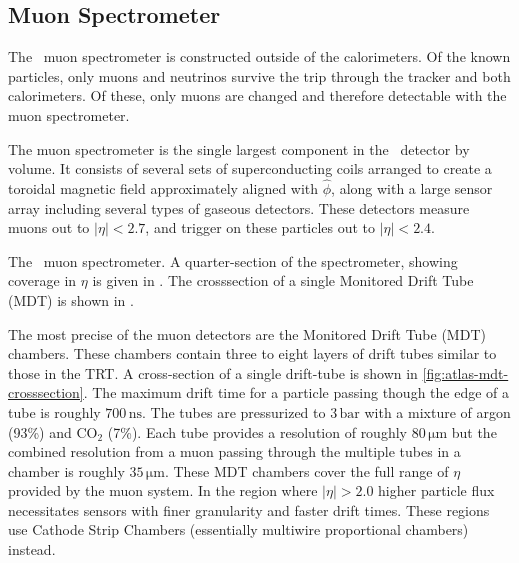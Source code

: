 \subsection{Muon Spectrometer}
\label{sec:atlas-muon}
The \atlas\ muon spectrometer is constructed outside of the calorimeters.
Of the known particles, only muons and neutrinos survive the trip through the tracker and both calorimeters.
Of these, only muons are changed and therefore detectable with the muon spectrometer.

The muon spectrometer is the single largest component in the \atlas\ detector by volume.
It consists of several sets of superconducting coils arranged to create a toroidal magnetic field approximately aligned with $\hat{\phi}$, along with a large sensor array including several types of gaseous detectors.
These detectors measure muons out to $|\eta| < 2.7$, and trigger on these particles out to $|\eta| < 2.4$.

\begin{cfig}
  \caption[\atlas\ muon spectrometer]{The \atlas\ muon spectrometer.
    A quarter-section of the spectrometer, showing coverage in $\eta$ is given in .
    The crosssection of a single Monitored Drift Tube (MDT) is shown in .}
  \label{fig:atlas-muon-spec}
\end{cfig}

The most precise of the muon detectors are the Monitored Drift Tube (MDT) chambers.
These chambers contain three to eight layers of drift tubes similar to those in the TRT.
A cross-section of a single drift-tube is shown in \cref{fig:atlas-mdt-crosssection}.
The maximum drift time for a particle passing though the edge of a tube is roughly $700\,\mathrm{ns}$.
The tubes are pressurized to $3\,\mathrm{bar}$ with a mixture of argon (93\%) and CO$_2$ (7\%).
Each tube provides a resolution of roughly $80\,\mathrm{\mu m}$ but the combined resolution from a muon passing through the multiple tubes in a chamber is roughly $35\,\mathrm{\mu m}$.
These MDT chambers cover the full range of $\eta$ provided by the muon system.
In the region where $|\eta| > 2.0$ higher particle flux necessitates sensors with finer granularity and faster drift times.
These regions use Cathode Strip Chambers (essentially multiwire proportional chambers) instead.

